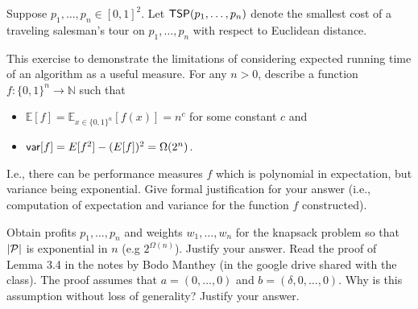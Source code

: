 \documentclass[solution,addpoints,12pt]{exam}
\newcommand{\tsp}{{\sf TSP}}
\begin{document}
\begin{questions}
\question[10]   Suppose $p_1,\ldots, p_n \in [0,1]^2$. Let $\tsp(p_1,\ldots, p_n)$ denote the smallest cost of a traveling salesman's tour on $p_1,\ldots, p_n$ with respect to Euclidean distance.
\question[7]    This exercise to demonstrate the limitations of considering expected running time of an algorithm as a useful measure. For any $n>0$, describe  a function $f:\{0,1\}^n \to \mathbb{N}$ such that
\begin{itemize}
\item $\mathbb{E}[f] = \mathbb{E}_{x\in \{0,1\}^n}[f(x)] = n^c$ for some constant $c$ and
\item ${\sf var}[f] = E[f^2] - (E[f])^2 = \Omega(2^n)$. 
\end{itemize}
I.e., there can be performance measures $f$ which is polynomial in expectation, but variance being exponential. Give formal justification for your answer (i.e., computation of expectation and variance for the function $f$ constructed).


\question[7] Obtain profits $p_1,\ldots, p_n$ and weights $w_1,\ldots, w_n$ for the knapsack problem so that $|{\cal P}|$ is exponential in $n$ (e.g $2^{\Omega(n)}$). Justify your answer.   
\question[6] Read the proof of Lemma 3.4 in the notes by Bodo Manthey (in the google drive shared with the class). The proof assumes that $a=(0,\ldots, 0)$ and $b=(\delta, 0,\ldots, 0)$. Why is this assumption without loss of generality? Justify your answer.


\end{questions}
\end{document}
